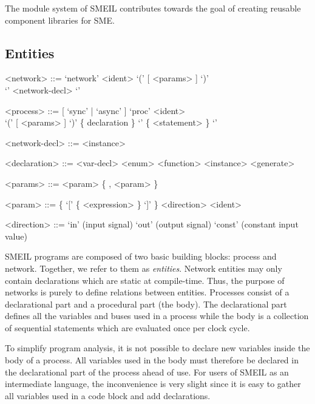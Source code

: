The module system of SMEIL contributes towards the goal of creating reusable
component libraries for SME. 



\subsection{Entities}
\begin{grammar}
  <network> ::= `network' <ident> `(' [ <params> ] `)' \\`{' <network-decl> `}'

  <process> ::= [ `sync' | `async' ] `proc' <ident> \\ `(' [
             <params> ] `)' \{ declaration \} `{' \{ <statement> \} `}'

  <network-decl> ::= <instance>

  <declaration> ::= <var-decl>
  \alt <enum>
  \alt <function>
  \alt <instance>
  \alt <generate>
  
  <params> ::= <param> \{ , <param> \}

  <param> ::= \{ `[' \{ <expression> \} `]' \} <direction> <ident>

  <direction> ::= `in' (input signal)
  \alt `out' (output signal)
  \alt `const' (constant input value)  
\end{grammar}

SMEIL programs are composed of two basic building blocks: {\ttfamily
  process} and {\ttfamily network}. Together, we refer to them as {\itshape
  entities}. Network entities may only contain declarations which are static at
compile-time. Thus, the purpose of networks is purely to define relations
between entities.  Processes consist of a declarational part and a procedural
part (the body). The declarational part defines all the variables and buses used
in a process while the body is a collection of sequential statements which are
evaluated once per clock cycle.

To simplify program analysis, it is not possible to declare new variables inside
the body of a process. All variables used in the body must therefore be declared
in the declarational part of the process ahead of use.
For users of SMEIL as an intermediate
language, the inconvenience is very slight since it is easy to gather all
variables used in a code block and add declarations.

